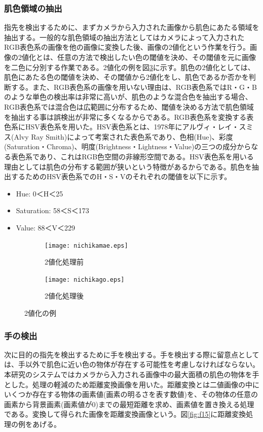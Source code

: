 \documentclass[11pt,a4j, titlepage]{jarticle} %
\begin{document}
\subsubsection{肌色領域の抽出}
指先を検出するために、まずカメラから入力された画像から肌色にあたる領域を抽出する。一般的な肌色領域の抽出方法としてはカメラによって入力されたRGB表色系の画像を他の画像に変換した後、画像の2値化という作業を行う。画像の2値化とは、任意の方法で検出したい色の閾値を決め、その閾値を元に画像を二色に分別する作業である。2値化の例を図\ref{fig:f14}に示す。肌色の2値化としては、肌色にあたる色の閾値を決め、その閾値から2値化をし、肌色であるか否かを判断する。また、RGB表色系の画像を用いない理由は、RGB表色系ではR・G・Bのような単色の検出率は非常に高いが、肌色のような混合色を抽出する場合、RGB表色系では混合色は広範囲に分布するため、閾値を決める方法で肌色領域を抽出する事は誤検出が非常に多くなるからである。RGB表色系を変換する表色系にHSV表色系を用いた。HSV表色系とは、1978年にアルヴィ・レイ・スミス(Alvy Ray Smith)によって考案された表色系であり、色相(Hue)、彩度(Saturation・Chroma)、明度(Brightness・Lightness・Value)の三つの成分からなる表色系であり、これはRGB色空間の非線形空間である。HSV表色系を用いる理由としては肌色の分布する範囲が狭いという特徴があるからである。肌色を抽出するためのHSV表色系でのH・S・Vのそれぞれの閾値を以下に示す。

\begin{itemize}
	\item Hue: 0＜H＜25
	\item Saturation: 58＜S＜173
	\item Value: 88＜V＜229
\end{itemize}

\begin{figure}[H]
	\centering
	\begin{subfigure}{0.4\columnwidth}
		\centering
		\texttt{[image: nichikamae.eps]}
		\caption{2値化処理前}
		\label{fig:nichikamae}
	\end{subfigure}
	\begin{subfigure}{0.4\columnwidth}
		\centering
		\texttt{[image: nichikago.eps]}
		\caption{2値化処理後}
		\label{fig:nichikago}
	\end{subfigure}
	\caption{2値化の例}
	\label{fig:f14}
\end{figure}

\subsubsection{手の検出}
次に目的の指先を検出するために手を検出する。手を検出する際に留意点としては、手以外で肌色に近い色の物体が存在する可能性を考慮しなければならない。本研究のシステムではカメラから入力される画像中の最大面積の肌色の物体を手とした。処理の軽減のため距離変換画像を用いた。距離変換とは二値画像の中にいくつか存在する物体の画素値(画素の明るさを表す数値)を、その物体の任意の画素から背景画素(画素値が0)までの最短距離を求め、画素値を置き換える処理である。変換して得られた画像を距離変換画像という。図\ref{fig:f15}に距離変換処理の例をあげる。
\end{document}
